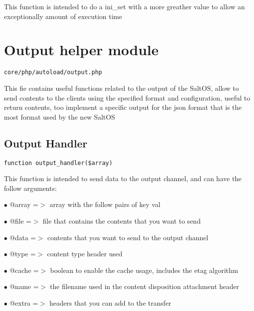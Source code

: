 \documentclass[a4paper]{book}
\begin{document}
This function is intended to do a ini\_set with a more greather value to allow an
exceptionally amount of execution time

\hypertarget{toc198}{}
\section{Output helper module}

\begin{lstlisting}
core/php/autoload/output.php
\end{lstlisting}

This fie contains useful functions related to the output of the SaltOS, allow to send contents to
the clients using the specified format and configuration, useful to return contents, too implement
a specific output for the json format that is the most format used by the new SaltOS

\hypertarget{toc199}{}
\subsection{Output Handler}

\begin{lstlisting}
function output_handler($array)
\end{lstlisting}

This function is intended to send data to the output channel, and can have
the follow arguments:

\begin{compactitem}
\item[\color{myblue}$\bullet$] @array =$>$ array with the follow pairs of key val
\item[\color{myblue}$\bullet$] @file  =$>$ file that contains the contents that you want to send
\item[\color{myblue}$\bullet$] @data  =$>$ contents that you want to send to the output channel
\item[\color{myblue}$\bullet$] @type  =$>$ content type header used
\item[\color{myblue}$\bullet$] @cache =$>$ boolean to enable the cache usage, includes the etag algorithm
\item[\color{myblue}$\bullet$] @name  =$>$ the filename used in the content disposition attachment header
\item[\color{myblue}$\bullet$] @extra =$>$ headers that you can add to the transfer
\end{compactitem}

\hypertarget{toc200}{}
\end{document}
